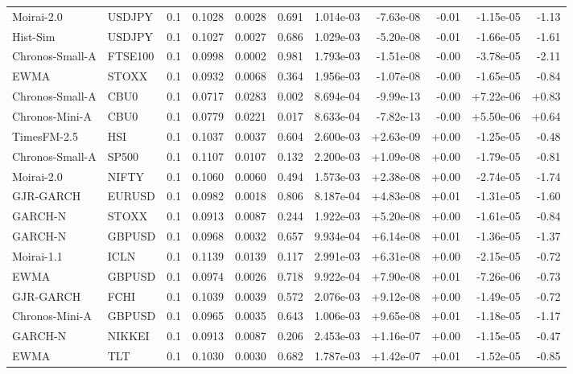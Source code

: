 \begin{tabular}{llrrrrrrrrr}
Moirai-2.0 & USDJPY & 0.1 & 0.1028 & 0.0028 & 0.691 & 1.014e-03 & -7.63e-08 & -0.01 & -1.15e-05 & -1.13 \\
Hist-Sim & USDJPY & 0.1 & 0.1027 & 0.0027 & 0.686 & 1.029e-03 & -5.20e-08 & -0.01 & -1.66e-05 & -1.61 \\
Chronos-Small-A & FTSE100 & 0.1 & 0.0998 & 0.0002 & 0.981 & 1.793e-03 & -1.51e-08 & -0.00 & -3.78e-05 & -2.11 \\
EWMA & STOXX & 0.1 & 0.0932 & 0.0068 & 0.364 & 1.956e-03 & -1.07e-08 & -0.00 & -1.65e-05 & -0.84 \\
Chronos-Small-A & CBU0 & 0.1 & 0.0717 & 0.0283 & 0.002 & 8.694e-04 & -9.99e-13 & -0.00 & +7.22e-06 & +0.83 \\
Chronos-Mini-A & CBU0 & 0.1 & 0.0779 & 0.0221 & 0.017 & 8.633e-04 & -7.82e-13 & -0.00 & +5.50e-06 & +0.64 \\
TimesFM-2.5 & HSI & 0.1 & 0.1037 & 0.0037 & 0.604 & 2.600e-03 & +2.63e-09 & +0.00 & -1.25e-05 & -0.48 \\
Chronos-Small-A & SP500 & 0.1 & 0.1107 & 0.0107 & 0.132 & 2.200e-03 & +1.09e-08 & +0.00 & -1.79e-05 & -0.81 \\
Moirai-2.0 & NIFTY & 0.1 & 0.1060 & 0.0060 & 0.494 & 1.573e-03 & +2.38e-08 & +0.00 & -2.74e-05 & -1.74 \\
GJR-GARCH & EURUSD & 0.1 & 0.0982 & 0.0018 & 0.806 & 8.187e-04 & +4.83e-08 & +0.01 & -1.31e-05 & -1.60 \\
GARCH-N & STOXX & 0.1 & 0.0913 & 0.0087 & 0.244 & 1.922e-03 & +5.20e-08 & +0.00 & -1.61e-05 & -0.84 \\
GARCH-N & GBPUSD & 0.1 & 0.0968 & 0.0032 & 0.657 & 9.934e-04 & +6.14e-08 & +0.01 & -1.36e-05 & -1.37 \\
Moirai-1.1 & ICLN & 0.1 & 0.1139 & 0.0139 & 0.117 & 2.991e-03 & +6.31e-08 & +0.00 & -2.15e-05 & -0.72 \\
EWMA & GBPUSD & 0.1 & 0.0974 & 0.0026 & 0.718 & 9.922e-04 & +7.90e-08 & +0.01 & -7.26e-06 & -0.73 \\
GJR-GARCH & FCHI & 0.1 & 0.1039 & 0.0039 & 0.572 & 2.076e-03 & +9.12e-08 & +0.00 & -1.49e-05 & -0.72 \\
Chronos-Mini-A & GBPUSD & 0.1 & 0.0965 & 0.0035 & 0.643 & 1.006e-03 & +9.65e-08 & +0.01 & -1.18e-05 & -1.17 \\
GARCH-N & NIKKEI & 0.1 & 0.0913 & 0.0087 & 0.206 & 2.453e-03 & +1.16e-07 & +0.00 & -1.15e-05 & -0.47 \\
EWMA & TLT & 0.1 & 0.1030 & 0.0030 & 0.682 & 1.787e-03 & +1.42e-07 & +0.01 & -1.52e-05 & -0.85 \\

\end{tabular}
